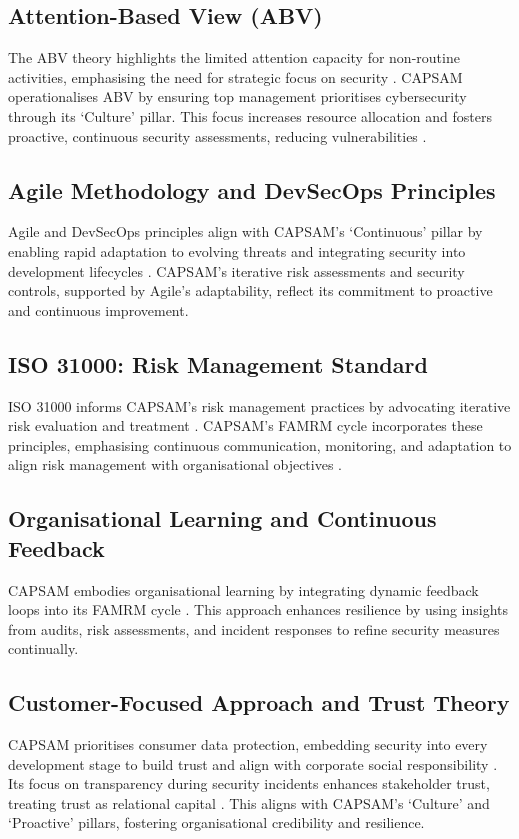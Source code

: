     \subsection{Attention-Based View (ABV)}
    The ABV theory highlights the limited attention capacity for non-routine activities, emphasising the need for strategic focus on security \citep{shaikh2023information}. CAPSAM operationalises ABV by ensuring top management prioritises cybersecurity through its `Culture' pillar. This focus increases resource allocation and fosters proactive, continuous security assessments, reducing vulnerabilities \citep{shaikh2023information}.

    \subsection{Agile Methodology and DevSecOps Principles}
    Agile and DevSecOps principles align with CAPSAM's `Continuous' pillar by enabling rapid adaptation to evolving threats and integrating security into development lifecycles \citep{ibm2021devsecops, dingsoyr2012agile}. CAPSAM's iterative risk assessments and security controls, supported by Agile's adaptability, reflect its commitment to proactive and continuous improvement.

    \subsection{ISO 31000: Risk Management Standard}
    ISO 31000 informs CAPSAM's risk management practices by advocating iterative risk evaluation and treatment \citep{purdy2010iso}. CAPSAM's FAMRM cycle incorporates these principles, emphasising continuous communication, monitoring, and adaptation to align risk management with organisational objectives \citep{purdy2010iso}.

    \subsection{Organisational Learning and Continuous Feedback}
    CAPSAM embodies organisational learning by integrating dynamic feedback loops into its FAMRM cycle \citep{murray2003continuous}. This approach enhances resilience by using insights from audits, risk assessments, and incident responses to refine security measures continually.

    \subsection{Customer-Focused Approach and Trust Theory}
    CAPSAM prioritises consumer data protection, embedding security into every development stage to build trust and align with corporate social responsibility \citep{moir2001csr, parmar2010stakeholder}. Its focus on transparency during security incidents enhances stakeholder trust, treating trust as relational capital \citep{castelfranchi2010trust}. This aligns with CAPSAM's `Culture' and `Proactive' pillars, fostering organisational credibility and resilience.

